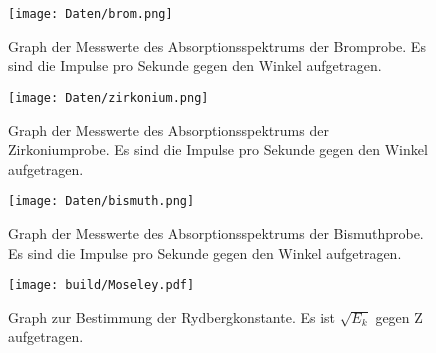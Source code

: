 \begin{figure}
  \centering
  \texttt{[image: Daten/brom.png]}
  \caption{Graph der Messwerte des Absorptionsspektrums der Bromprobe. Es
  sind die Impulse pro Sekunde gegen den Winkel aufgetragen.}
  \label{fig:brom}
\end{figure}

\begin{figure}
  \centering
  \texttt{[image: Daten/zirkonium.png]}
  \caption{Graph der Messwerte des Absorptionsspektrums der Zirkoniumprobe. Es
  sind die Impulse pro Sekunde gegen den Winkel aufgetragen.}
  \label{fig:zirkonium}
\end{figure}

\begin{figure}
  \centering
  \texttt{[image: Daten/bismuth.png]}
  \caption{Graph der Messwerte des Absorptionsspektrums der Bismuthprobe. Es
  sind die Impulse pro Sekunde gegen den Winkel aufgetragen.}
  \label{fig:bismuth}
\end{figure}

\begin{figure}
  \centering
  \texttt{[image: build/Moseley.pdf]}
  \caption{Graph zur Bestimmung der Rydbergkonstante. Es ist $\sqrt{E_k}$ gegen
  Z aufgetragen.}
  \label{fig:moseley}
\end{figure}

